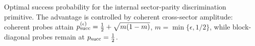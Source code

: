 \caption{Optimal success probability for the internal sector-parity discrimination primitive. The advantage is controlled by coherent cross-sector amplitude: coherent probes attain \(p_{\rm succ}^{(\epsilon)}=\tfrac12+\sqrt{m(1-m)}\), \(m=\min\{\epsilon,1/2\}\), while block-diagonal probes remain at \(p_{\rm succ}=\tfrac12\).}
